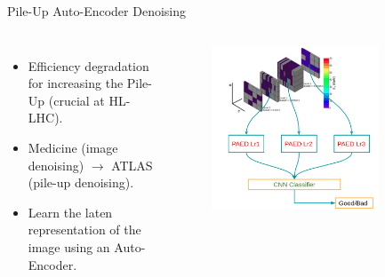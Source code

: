 \begin{frame}{Pile-Up Auto-Encoder Denoising}
\begin{columns}

\begin{itemize}
    \item Efficiency degradation for increasing the Pile-Up (crucial at HL-LHC).
    \item Medicine (image denoising) $\to$ ATLAS (pile-up denoising).
    \item Learn the laten representation of the image using an Auto-Encoder.
\end{itemize}
    
\begin{figure}
    \centering
    \includegraphics[width=0.8\textwidth]{BackUp/Part6/Img/PAED.png}
\end{figure}
\end{columns}
\end{frame}


